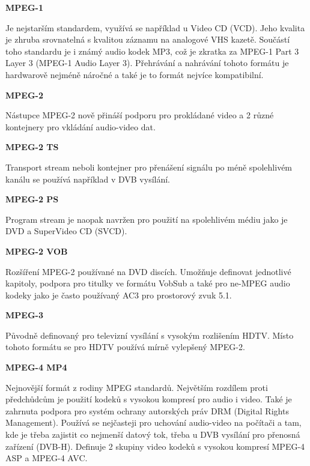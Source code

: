 \textbf{MPEG-1}

Je nejstarším standardem, využívá se například u Video CD (VCD). Jeho kvalita je zhruba srovnatelná s kvalitou záznamu na analogové VHS kazetě. Součástí toho standardu je i známý audio kodek MP3, což je zkratka za MPEG-1 Part 3 Layer 3 (MPEG-1 Audio Layer 3). Přehrávání a nahrávání tohoto formátu je hardwarově nejméně náročné a také je to formát nejvíce kompatibilní.

\vspace{10pt}

\textbf{MPEG-2}

Nástupce MPEG-2 nově přináší podporu pro prokládané video a 2 různé kontejnery pro vkládání audio-video dat.

\vspace{10pt}

\textbf{MPEG-2 TS}

Transport stream neboli kontejner pro přenášení signálu po méně spolehlivém kanálu se používá například v DVB vysílání. 

\vspace{10pt}

\textbf{MPEG-2 PS}

Program stream je naopak navržen pro použití na spolehlivém médiu jako je DVD a SuperVideo CD (SVCD).

\vspace{10pt}

\textbf{MPEG-2 VOB}

Rozšíření MPEG-2 používané na DVD discích. Umožňuje definovat jednotlivé kapitoly, podpora pro titulky ve formátu VobSub a také pro ne-MPEG audio kodeky jako je často používaný AC3 pro prostorový zvuk 5.1.

\vspace{10pt}

\textbf{MPEG-3}

Původně definovaný pro televizní vysílání s vysokým rozlišením HDTV. Místo tohoto formátu se pro HDTV používá mírně vylepšený MPEG-2.

\vspace{10pt}

\textbf{MPEG-4 MP4}

Nejnovější formát z rodiny MPEG standardů. Největším rozdílem proti předchůdcům je použití kodeků s vysokou kompresí pro audio i video. Také je zahrnuta podpora pro systém ochrany autorských práv DRM (Digital Rights Management). Používá se nejčasteji pro uchování audio-video na počítači a tam, kde je třeba zajistit co nejmenší datový tok, třeba u DVB vysílání pro přenosná zařízení (DVB-H). Definuje 2 skupiny video kodeků s vysokou kompresí MPEG-4 ASP a MPEG-4 AVC.

